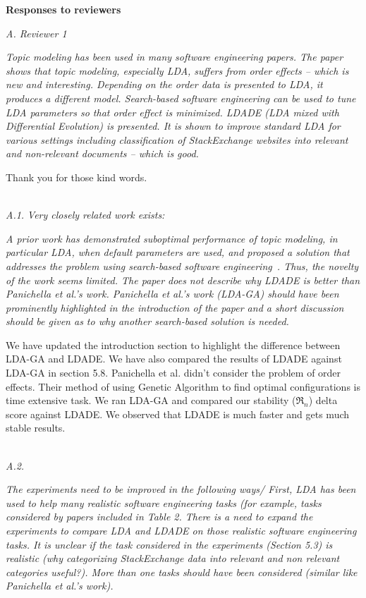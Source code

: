 \documentclass[conference]{IEEEtran}
\begin{document}
\pagestyle{plain}
\noindent
\textbf{Responses to reviewers\\}

\noindent
\textit{A. Reviewer 1}

\textit{Topic modeling has been used in many software engineering papers. The paper shows that topic modeling, especially LDA, suffers from order effects -- which is new and interesting. Depending on the order data is presented to LDA, it produces a different model. Search-based software engineering can be used to tune LDA parameters so that order effect is minimized. LDADE (LDA mixed with Differential Evolution) is presented. It is shown to improve standard LDA for various settings including classification of StackExchange websites into relevant and non-relevant documents -- which is good.}

Thank you for those kind words.

\noindent
\textit{\\A.1.}
\textit{Very closely related work exists:}

\textit{A prior work has demonstrated suboptimal performance of topic modeling, in particular LDA, when default parameters are used, and proposed a solution that addresses the problem using search-based software engineering~\cite{panichella2013effectively}. Thus, the novelty of the work seems limited. The paper does not describe why LDADE is better than Panichella et al.'s work. Panichella et al.'s work (LDA-GA) should have been prominently highlighted in the introduction of the paper and a short discussion should be given as to why another search-based solution is needed.\\}

We have updated the introduction section to highlight the difference between LDA-GA and LDADE. We have also compared the results of LDADE against LDA-GA in section 5.8.
Panichella et al. didn't consider the problem of order effects. Their method of using Genetic Algorithm to find optimal configurations is time extensive task. We ran LDA-GA and compared our stability ($\Re_n$) delta score against LDADE. We observed that LDADE is much faster and gets much stable results. 


\noindent
\textit{\\A.2.} 

\textit{The experiments need to be improved in the following ways/ First, LDA has been used to help many realistic software engineering tasks (for example, tasks considered by papers included in Table 2. There is a need to expand the experiments to compare LDA and LDADE on those realistic software engineering tasks. It is unclear if the task considered in the experiments (Section 5.3) is realistic (why categorizing StackExchange data into relevant and non relevant categories useful?). More than one tasks should have been considered (similar like Panichella et al.'s work).\\}
\end{document}
